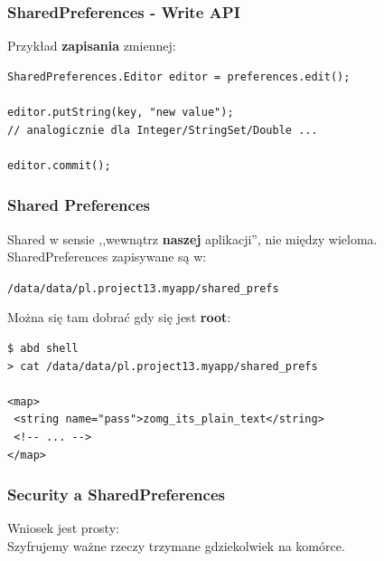 \begin{frame}[fragile]\frametitle{SharedPreferences - Write API}
 Przykład \textbf{zapisania} zmiennej:
\begin{lstlisting}
SharedPreferences.Editor editor = preferences.edit();

editor.putString(key, "new value");
// analogicznie dla Integer/StringSet/Double ...

editor.commit();
\end{lstlisting}
\end{frame}


\begin{frame}[fragile]\frametitle{Shared Preferences}
 Shared w sensie ,,wewnątrz \textbf{naszej} aplikacji'', nie między wieloma.\\
 SharedPreferences zapisywane są w: \\
 \begin{center}
  \texttt{/data/data/pl.project13.myapp/shared\_prefs} 
 \end{center}

\pause

Można się tam dobrać gdy się jest \textbf{root}:
\begin{verbatim}
$ abd shell
> cat /data/data/pl.project13.myapp/shared_prefs

<map>
 <string name="pass">zomg_its_plain_text</string>
 <!-- ... -->
</map>
\end{verbatim}
\end{frame}


\begin{frame}\frametitle{Security a SharedPreferences}
\begin{center}
 Wniosek jest prosty:\\ 
 Szyfrujemy ważne rzeczy trzymane gdziekolwiek na komórce.
\end{center}
\end{frame}


